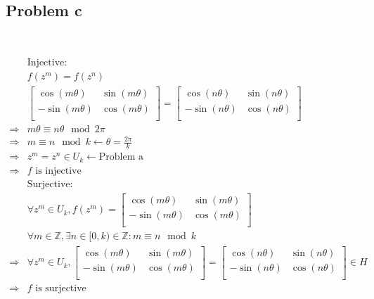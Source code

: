 \documentclass{article}
\begin{document}
~

\subsection*{Problem c}

~

\begin{equation*}
    \begin{split}
        &\text{Injective}:\\
        &f(z^m)=f(z^n)\\
        &\begin{bmatrix}
            \cos(m\theta)&\sin(m\theta)\\
            -\sin(m\theta)&\cos(m\theta)\\
        \end{bmatrix}=\begin{bmatrix}
            \cos(n\theta)&\sin(n\theta)\\
            -\sin(n\theta)&\cos(n\theta)\\
        \end{bmatrix}\\
        \Rightarrow&m\theta\equiv n\theta \mod 2\pi\\
        \Rightarrow&m\equiv n\mod k\leftarrow\theta=\frac{2\pi}{k}\\
        \Rightarrow&z^m=z^n\in U_k\leftarrow\text{Problem a}\\
        \Rightarrow&f\text{ is injective}\\
        &\text{Surjective}:\\
        &\forall z^m\in U_k ,f(z^m)=\begin{bmatrix}
            \cos(m\theta)&\sin(m\theta)\\
            -\sin(m\theta)&\cos(m\theta)\\
        \end{bmatrix}\\
        &\forall m\in\mathbb{Z} ,\exists n\in[0,k)\in\mathbb{Z} :m\equiv n\mod k\\
        \Rightarrow&\forall z^m\in U_k,\begin{bmatrix}
            \cos(m\theta)&\sin(m\theta)\\
            -\sin(m\theta)&\cos(m\theta)\\
        \end{bmatrix}=\begin{bmatrix}
            \cos(n\theta)&\sin(n\theta)\\
            -\sin(n\theta)&\cos(n\theta)\\
        \end{bmatrix}\in H\\
        \Rightarrow&f\text{ is surjective}\\
    \end{split}
\end{equation*}
\end{document}
